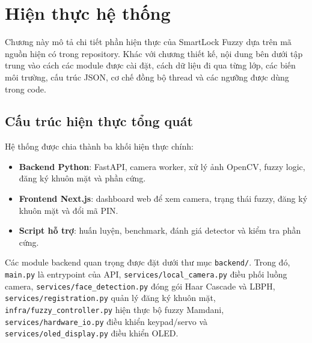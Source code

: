 \section{Hiện thực hệ thống}

Chương này mô tả chi tiết phần hiện thực của SmartLock Fuzzy dựa trên mã nguồn hiện có trong repository. Khác với chương thiết kế, nội dung bên dưới tập trung vào cách các module được cài đặt, cách dữ liệu đi qua từng lớp, các biến môi trường, cấu trúc JSON, cơ chế đồng bộ thread và các ngưỡng được dùng trong code.

\subsection{Cấu trúc hiện thực tổng quát}

Hệ thống được chia thành ba khối hiện thực chính:

\begin{itemize}
    \item \textbf{Backend Python}: FastAPI, camera worker, xử lý ảnh OpenCV, fuzzy logic, đăng ký khuôn mặt và phần cứng.
    \item \textbf{Frontend Next.js}: dashboard web để xem camera, trạng thái fuzzy, đăng ký khuôn mặt và đổi mã PIN.
    \item \textbf{Script hỗ trợ}: huấn luyện, benchmark, đánh giá detector và kiểm tra phần cứng.
\end{itemize}

Các module backend quan trọng được đặt dưới thư mục \texttt{backend/}. Trong đó, \texttt{main.py} là entrypoint của API, \texttt{services/local\_camera.py} điều phối luồng camera, \texttt{services/face\_detection.py} đóng gói Haar Cascade và LBPH, \texttt{services/registration.py} quản lý đăng ký khuôn mặt, \texttt{infra/fuzzy\_controller.py} hiện thực bộ fuzzy Mamdani, \texttt{services/hardware\_io.py} điều khiển keypad/servo và \texttt{services/oled\_display.py} điều khiển OLED.

